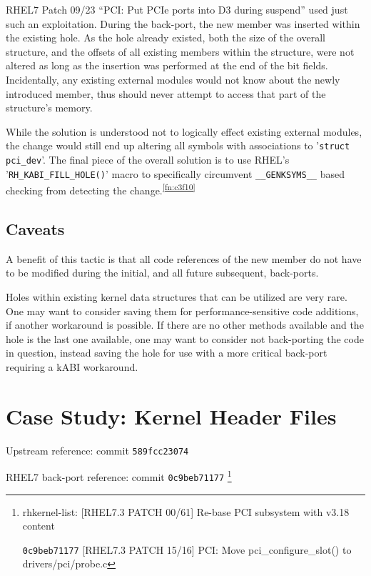 \documentclass[10pt,oneside,english]{book}
\begin{document}
RHEL7 Patch 09/23 ``PCI: Put PCIe ports into D3 during suspend''
used just such an exploitation. During the back-port, the new member
was inserted within the existing hole. As the hole already existed,
both the size of the overall structure, and the offsets of all existing
members within the structure, were not altered as long as the insertion
was performed at the end of the bit fields. Incidentally, any existing
external modules would not know about the newly introduced member,
thus should never attempt to access that part of the structure's memory.

While the solution is understood not to logically effect existing
external modules, the change would still end up altering all symbols
with associations to '\texttt{struct pci\_dev}'. The final piece of
the overall solution is to use RHEL's '\texttt{RH\_KABI\_FILL\_HOLE()}'
macro to specifically circumvent \texttt{\_\_GENKSYMS\_\_} based checking
from detecting the change.\textsuperscript{\ref{fn:c3f10}}

\subsection{Caveats}

A benefit of this tactic is that all code references of the new member
do not have to be modified during the initial, and all future subsequent,
back-ports.

Holes within existing kernel data structures that can be utilized
are very rare. One may want to consider saving them for performance-sensitive
code additions, if another workaround is possible. If there are no
other methods available and the hole is the last one available, one
may want to consider not back-porting the code in question, instead
saving the hole for use with a more critical back-port requiring a
kABI workaround.

\section{Case Study: Kernel Header Files \label{sec:Case-Study:Kernel-Header-Files}}

Upstream reference: commit \texttt{589fcc23074}

RHEL7 back-port reference: commit \texttt{0c9beb71177} \footnote{\label{fn:b5f13}rhkernel-list: {[}RHEL7.3 PATCH 00/61{]} Re-base
PCI subsystem with v3.18 content

\texttt{0c9beb71177} {[}RHEL7.3 PATCH 15/16{]} PCI: Move pci\_configure\_slot()
to drivers/pci/probe.c}
\end{document}

